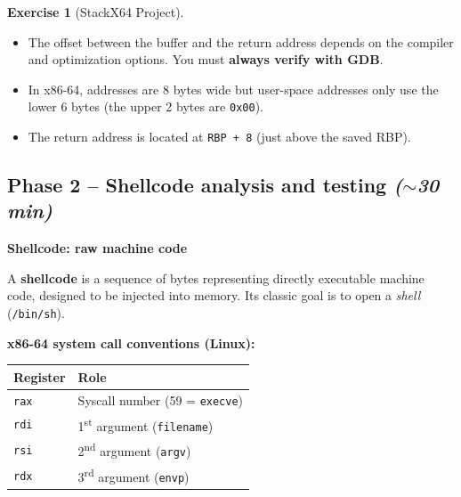 \documentclass[a4paper,11pt]{article}
\theoremstyle{plain}
\theoremstyle{definition}
\newtheorem{exercice}{Exercise}
\begin{document}
\begin{exercice}[StackX64 Project]
\begin{correction}
\begin{pointcle}
\begin{itemize}
    \item The offset between the buffer and the return address depends on the compiler and optimization options. You must \textbf{always verify with GDB}.
    \item In x86-64, addresses are 8 bytes wide but user-space addresses only use the lower 6 bytes (the upper 2 bytes are \texttt{0x00}).
    \item The return address is located at \texttt{RBP + 8} (just above the saved RBP).
\end{itemize}
\end{pointcle}

\end{correction}



\subsection*{Phase 2 -- Shellcode analysis and testing \hfill\normalfont\textit{($\sim$30 min)}}

\begin{rappel}
\textbf{Shellcode: raw machine code}

A \textbf{shellcode} is a sequence of bytes representing directly executable machine code, designed to be injected into memory. Its classic goal is to open a \textit{shell} (\texttt{/bin/sh}).

\medskip
\textbf{x86-64 system call conventions (Linux):}
\begin{center}
\begin{tabular}{ll}
\toprule
\textbf{Register} & \textbf{Role} \\
\midrule
\texttt{rax} & Syscall number (59 = \texttt{execve}) \\
\texttt{rdi} & 1\textsuperscript{st} argument (\texttt{filename}) \\
\texttt{rsi} & 2\textsuperscript{nd} argument (\texttt{argv}) \\
\texttt{rdx} & 3\textsuperscript{rd} argument (\texttt{envp}) \\
\bottomrule
\end{tabular}
\end{center}


\end{rappel}
\end{exercice}
\end{document}
